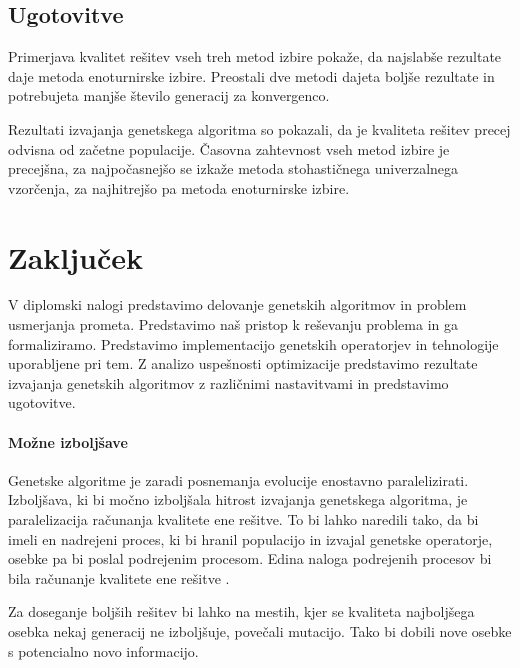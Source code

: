 \documentclass[a4paper, 12pt]{book}
\begin{document}
\section{Ugotovitve}

Primerjava kvalitet re\v sitev vseh treh metod izbire poka\v ze, da najslab\v se rezultate daje metoda enoturnirske izbire. Preostali dve metodi dajeta bolj\v se rezultate in potrebujeta manj\v se \v stevilo generacij za konvergenco.

Rezultati izvajanja genetskega algoritma so pokazali, da je kvaliteta re\v sitev precej odvisna od za\v cetne populacije.
\v Casovna zahtevnost vseh metod izbire je precej\v sna, za najpo\v casnej\v so se izka\v ze metoda stohasti\v cnega univerzalnega vzor\v cenja, za najhitrej\v so pa metoda enoturnirske izbire.

\chapter{Zaklju\v cek}
V diplomski nalogi predstavimo delovanje genetskih algoritmov in problem usmerjanja prometa.
Predstavimo na\v s pristop k re\v sevanju problema in ga formaliziramo. Predstavimo implementacijo genetskih operatorjev in tehnologije uporabljene pri tem. Z analizo uspe\v snosti optimizacije predstavimo rezultate izvajanja genetskih algoritmov z razli\v cnimi nastavitvami in predstavimo ugotovitve. 

\subsubsection{Mo\v zne izbolj\v save}

Genetske algoritme je zaradi posnemanja evolucije enostavno paralelizirati. Izbolj\v sava, ki bi mo\v cno izbolj\v sala hitrost izvajanja genetskega algoritma, je paralelizacija ra\v cunanja kvalitete ene re\v sitve. To bi lahko naredili tako, da bi imeli en nadrejeni proces, ki bi hranil populacijo in izvajal genetske operatorje, osebke pa bi poslal podrejenim procesom. Edina naloga podrejenih procesov bi bila ra\v cunanje kvalitete ene re\v sitve
\cite{uc3m}.

Za doseganje bolj\v sih re\v sitev bi lahko na mestih, kjer se kvaliteta najbolj\v sega osebka nekaj generacij ne izbolj\v suje, pove\v cali mutacijo. Tako bi dobili nove osebke s potencialno novo informacijo.
\end{document}
